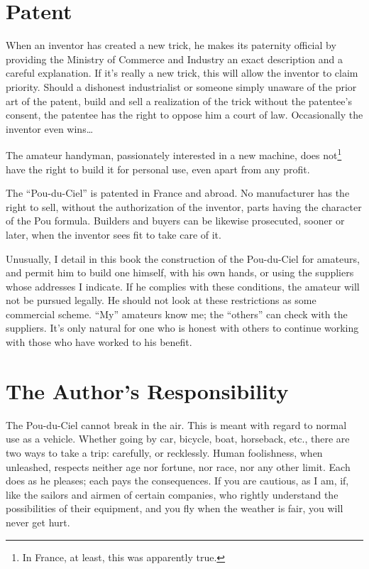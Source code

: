 \documentclass{book}
\begin{document}
\section{Patent}

When an inventor has created a new trick, he makes its paternity
official by providing the Ministry of Commerce and Industry an exact
description and a careful explanation. If it's really a new trick,
this will allow the inventor to claim priority. Should a dishonest
industrialist or someone simply unaware of the prior art of the
patent, build and sell a realization of the trick without the
patentee's consent, the patentee has the right to oppose him a court
of law. Occasionally the inventor even wins\ldots

The amateur handyman, passionately interested in a new machine, does
not\footnote{In France, at least, this was apparently true.} have the
right to build it for personal use, even apart from any profit.

The ``Pou-du-Ciel'' is patented in France and abroad. No manufacturer
has the right to sell, without the authorization of the inventor,
parts having the character of the Pou formula. Builders and buyers can
be likewise prosecuted, sooner or later, when the inventor sees fit to
take care of it.

Unusually, I detail in this book the construction of the Pou-du-Ciel
for amateurs, and permit him to build one himself, with his own hands,
or using the suppliers whose addresses I indicate. If he complies with
these conditions, the amateur will not be pursued legally. He should
not look at these restrictions as some commercial scheme. ``My''
amateurs know me; the ``others'' can check with the suppliers. It's
only natural for one who is honest with others to continue working
with those who have worked to his benefit.

\section{The Author's Responsibility}

The Pou-du-Ciel cannot break in the air. This is meant with regard to
normal use as a vehicle. Whether going by car, bicycle, boat,
horseback, etc., there are two ways to take a trip: carefully, or
recklessly.  Human foolishness, when unleashed, respects neither age
nor fortune, nor race, nor any other limit. Each does as he pleases;
each pays the consequences.  If you are cautious, as I am, if, like
the sailors and airmen of certain companies, who rightly understand
the possibilities of their equipment, and you fly when the weather is
fair, you will never get hurt.
\end{document}
